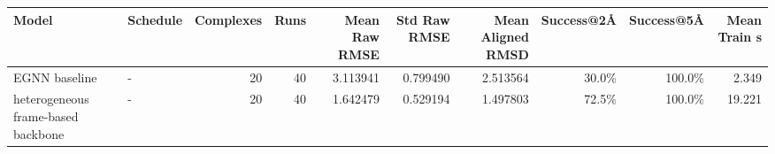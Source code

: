 \begin{tabular}{llrrrrrrrr}
\toprule
Model & Schedule & Complexes & Runs & Mean Raw RMSE & Std Raw RMSE & Mean Aligned RMSD & Success@2\AA{} & Success@5\AA{} & Mean Train s \\
\midrule
EGNN baseline & - & 20 & 40 & 3.113941 & 0.799490 & 2.513564 & 30.0\% & 100.0\% & 2.349 \\
heterogeneous frame-based backbone & - & 20 & 40 & 1.642479 & 0.529194 & 1.497803 & 72.5\% & 100.0\% & 19.221 \\
\bottomrule
\end{tabular}
